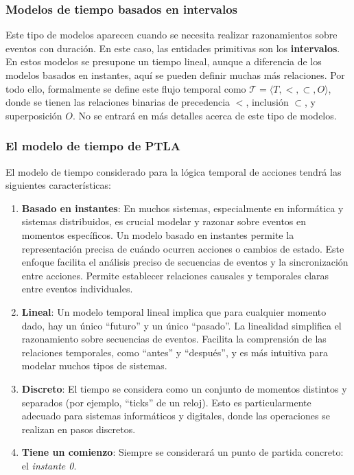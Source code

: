 \subsubsection{Modelos de tiempo basados en intervalos}\label{subsubsection:TLAtimeinterval}
Este tipo de modelos aparecen cuando se necesita realizar razonamientos sobre eventos con duración. En este caso, las entidades primitivas son los \textbf{intervalos}. En estos modelos se presupone un tiempo lineal, aunque a diferencia de los modelos basados en instantes, aquí se pueden definir muchas más relaciones. Por todo ello, formalmente se define este flujo temporal como $\mathcal{T} = \langle T,<,\subset,O \rangle$, donde se tienen las relaciones binarias de precedencia $<$, inclusión $\subset$, y superposición $O$. No se entrará en más detalles acerca de este tipo de modelos.

\subsubsection{El modelo de tiempo de PTLA}\label{subsubsection:TLAtimedecision}
El modelo de tiempo considerado para la lógica temporal de acciones tendrá las siguientes características:
\begin{enumerate}
    \item \textbf{Basado en instantes}: En muchos sistemas, especialmente en informática y sistemas distribuidos, es crucial modelar y razonar sobre eventos en momentos específicos. Un modelo basado en instantes permite la representación precisa de cuándo ocurren acciones o cambios de estado. Este enfoque facilita el análisis preciso de secuencias de eventos y la sincronización entre acciones. Permite establecer relaciones causales y temporales claras entre eventos individuales.
    \item \textbf{Lineal}: Un modelo temporal lineal implica que para cualquier momento dado, hay un único ``futuro'' y un único ``pasado''. La linealidad simplifica el razonamiento sobre secuencias de eventos. Facilita la comprensión de las relaciones temporales, como ``antes'' y ``después'', y es más intuitiva para modelar muchos tipos de sistemas.
    \item \textbf{Discreto}: El tiempo se considera como un conjunto de momentos distintos y separados (por ejemplo, ``ticks'' de un reloj). Esto es particularmente adecuado para sistemas informáticos y digitales, donde las operaciones se realizan en pasos discretos.
    \item \textbf{Tiene un comienzo}: Siempre se considerará un punto de partida concreto: el \textit{instante 0}.
\end{enumerate}

